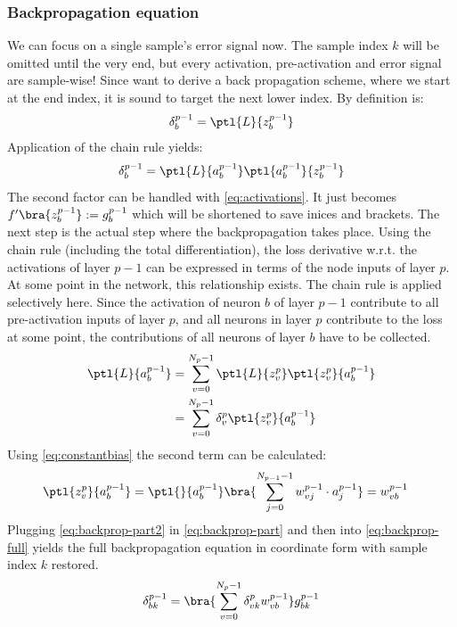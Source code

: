 \subsubsection{Backpropagation equation}
We can focus on a single sample's error signal now. The sample index $k$ will be omitted until the very end, but every activation, pre-activation and error signal are sample-wise! Since want to derive a back propagation scheme, where we start at the end index, it is sound to target the next lower index. By definition is:
\begin{align}
	\delta_b^{p-1}=\ptl{L}{z_b^{p-1}}
\end{align}
Application of the chain rule yields:
\begin{align}
	\label{eq:backprop-full}
	\delta_b^{p-1}=\ptl{L}{a_b^{p-1}}\ptl{a_b^{p-1}}{z_b^{p-1}}
\end{align}
The second factor can be handled with \eqref{eq:activations}. It just becomes $f^\prime\bra{z_b^{p-1}}:=g_b^{p-1}$ which will be shortened to save inices and brackets. The next step is the actual step where the backpropagation takes place. Using the chain rule (including the total differentiation), the loss derivative w.r.t. the activations of layer $p-1$ can be expressed in terms of the node inputs of layer $p$. At some point in the network, this relationship exists. The chain rule is applied selectively here. Since the activation of neuron $b$ of layer $p-1$ contribute to all pre-activation inputs  of layer $p$, and all neurons in layer $p$ contribute to the loss at some point, the contributions of all neurons of layer $b$ have to be collected.
\begin{align}
	\ptl{L}{a_b^{p-1}}&=\sum\limits_{v=0}^{N_p-1}\ptl{L}{z_v^{p}}\ptl{z_v^{p}}{a_b^{p-1}}\\
	\label{eq:backprop-part}
	&=\sum\limits_{v=0}^{N_p-1}\delta_v^p\ptl{z_v^{p}}{a_b^{p-1}}
\end{align}
Using \eqref{eq:constantbias} the second term can be calculated:
\begin{align}
	\label{eq:backprop-part2}
	\ptl{z_v^{p}}{a_b^{p-1}}&=\ptl{}{a_b^{p-1}}\bra{\sum\limits_{j=0}^{N_{p-1}-1}w_{vj}^{p-1}\cdot a_j^{p-1}}=w_{vb}^{p-1}
\end{align}
Plugging \eqref{eq:backprop-part2} in \eqref{eq:backprop-part} and then into \eqref{eq:backprop-full} yields the full backpropagation equation in coordinate form with sample index $k$ restored.
\begin{align}
	\label{eq:backprop-final}
	\delta_{bk}^{p-1}=\bra{\sum\limits_{v=0}^{N_p-1}\delta_{vk}^pw_{vb}^{p-1}}g_{bk}^{p-1}
\end{align}
